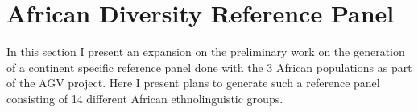 \section{African Diversity Reference Panel}
\label{sec:adrp}

In this section I present an expansion on the preliminary work on the generation of a continent specific reference panel done with the 3 African populations as part of the \gls{AGV} project. Here I present plans to generate such a reference panel consisting of 14 different African ethnolinguistic groups.



%
